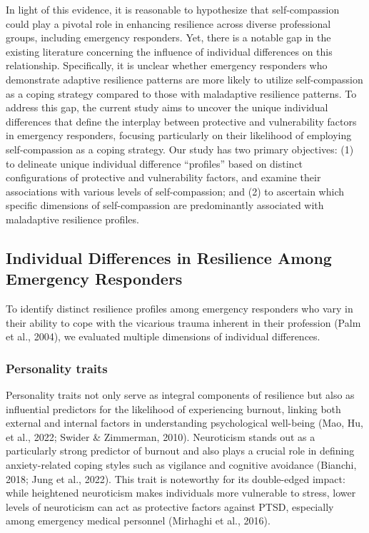 \documentclass[
  man,floatsintext]{apa7}
\begin{document}
In light of this evidence, it is reasonable to hypothesize that self-compassion could play a pivotal role in enhancing resilience across diverse professional groups, including emergency responders. Yet, there is a notable gap in the existing literature concerning the influence of individual differences on this relationship. Specifically, it is unclear whether emergency responders who demonstrate adaptive resilience patterns are more likely to utilize self-compassion as a coping strategy compared to those with maladaptive resilience patterns. To address this gap, the current study aims to uncover the unique individual differences that define the interplay between protective and vulnerability factors in emergency responders, focusing particularly on their likelihood of employing self-compassion as a coping strategy. Our study has two primary objectives: (1) to delineate unique individual difference ``profiles'' based on distinct configurations of protective and vulnerability factors, and examine their associations with various levels of self-compassion; and (2) to ascertain which specific dimensions of self-compassion are predominantly associated with maladaptive resilience profiles.

\hypertarget{individual-differences-in-resilience-among-emergency-responders}{%
\subsection{Individual Differences in Resilience Among Emergency Responders}\label{individual-differences-in-resilience-among-emergency-responders}}

To identify distinct resilience profiles among emergency responders who vary in their ability to cope with the vicarious trauma inherent in their profession (Palm et al., 2004), we evaluated multiple dimensions of individual differences.

\hypertarget{personality-traits}{%
\subsubsection{Personality traits}\label{personality-traits}}

Personality traits not only serve as integral components of resilience but also as influential predictors for the likelihood of experiencing burnout, linking both external and internal factors in understanding psychological well-being (Mao, Hu, et al., 2022; Swider \& Zimmerman, 2010). Neuroticism stands out as a particularly strong predictor of burnout and also plays a crucial role in defining anxiety-related coping styles such as vigilance and cognitive avoidance (Bianchi, 2018; Jung et al., 2022). This trait is noteworthy for its double-edged impact: while heightened neuroticism makes individuals more vulnerable to stress, lower levels of neuroticism can act as protective factors against PTSD, especially among emergency medical personnel (Mirhaghi et al., 2016).
\end{document}
